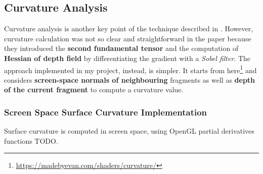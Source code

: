 \subsection{Curvature Analysis}
Curvature analysis is another key point of the technique described in \cite{referencePaper}. \newline
However, curvature calculation was not so clear and straightforward in the paper because they introduced the \textbf{second fundamental tensor} and the computation of \textbf{Hessian of depth field} by differentiating the gradient with a \textit{Sobel filter}. \newline
The approach implemented in my project, instead, is simpler. It starts from here\footnote{\url{https://madebyevan.com/shaders/curvature/}} and considers \textbf{screen-space normals of neighbouring} fragments as well as \textbf{depth of the current fragment} to compute a curvature value.
\subsubsection{Screen Space Surface Curvature Implementation}
Surface curvature is computed in screen space, using OpenGL partial derivatives functions TODO.